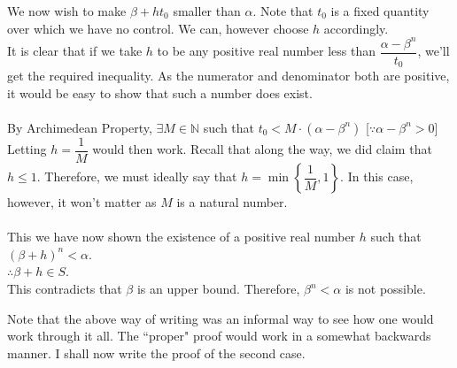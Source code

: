 We now wish to make $\beta + ht_0$ smaller than $\alpha$. Note that $t_0$ is a fixed quantity over which we have no control. We can, however choose $h$ accordingly.\\
It is clear that if we take $h$ to be any positive real number less than $\dfrac{\alpha-\beta^n}{t_0}$, we'll get the required inequality. As the numerator and denominator both are positive, it would be easy to show that such a number does exist.\\~\\
By Archimedean Property, $\exists M \in \mathbb{N}$ such that $t_0 < M\cdot(\alpha - \beta^n)$ \hfill [$\because \alpha - \beta^n > 0$]\\
Letting $h = \dfrac{1}{M}$ would then work. Recall that along the way, we did claim that $h \le 1$. Therefore, we must ideally say that $h = \min\left\{\dfrac{1}{M}, 1\right\}$. In this case, however, it won't matter as $M$ is a natural number.\\~\\
This we have now shown the existence of a positive real number $h$ such that $(\beta+h)^n < \alpha$.\\
$\therefore \beta + h \in S$.\\
This contradicts that $\beta$ is an upper bound. Therefore, $\beta^n < \alpha$ is not possible.

\dotfill

Note that the above way of writing was an informal way to see how one would work through it all. The ``proper" proof would work in a somewhat backwards manner. I shall now write the proof of the second case.

\dotfill

